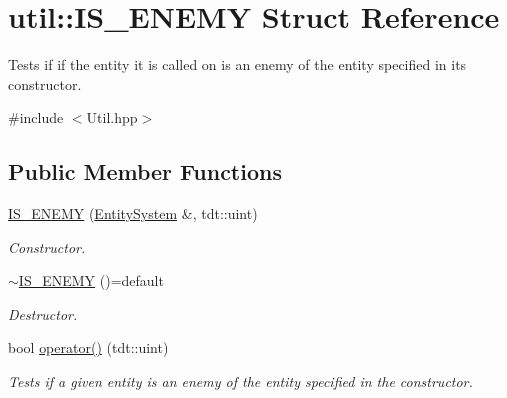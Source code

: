 \hypertarget{structutil_1_1_i_s___e_n_e_m_y}{}\section{util\+:\+:I\+S\+\_\+\+E\+N\+E\+MY Struct Reference}
\label{structutil_1_1_i_s___e_n_e_m_y}


Tests if if the entity it is called on is an enemy of the entity specified in it\textquotesingle{}s constructor.  




{\ttfamily \#include $<$Util.\+hpp$>$}

\subsection*{Public Member Functions}
\begin{DoxyCompactItemize}
\item 
\hyperlink{structutil_1_1_i_s___e_n_e_m_y_a56a44d69ca12a6c530aec0187b6d844c}{I\+S\+\_\+\+E\+N\+E\+MY} (\hyperlink{class_entity_system}{Entity\+System} \&, tdt\+::uint)
\begin{DoxyCompactList}\small\item\em Constructor. \end{DoxyCompactList}\item 
\hyperlink{structutil_1_1_i_s___e_n_e_m_y_aaa61addfe64acb80ddbfc9007e6bb994}{$\sim$\+I\+S\+\_\+\+E\+N\+E\+MY} ()=default
\begin{DoxyCompactList}\small\item\em Destructor. \end{DoxyCompactList}\item 
bool \hyperlink{structutil_1_1_i_s___e_n_e_m_y_a55a5af66f93ea4882305ee86e5bd0968}{operator()} (tdt\+::uint)
\begin{DoxyCompactList}\small\item\em Tests if a given entity is an enemy of the entity specified in the constructor. \end{DoxyCompactList}\end{DoxyCompactItemize}

